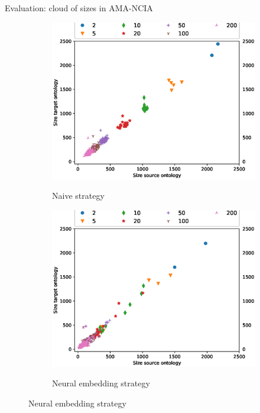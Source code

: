\documentclass[t]{beamer}
\begin{document}
\begin{frame}{Evaluation: cloud of sizes in AMA-NCIA }
	
\begin{figure}[t]
    \centering
    \begin{subfigure}[b]{0.495\textwidth}
        \centering
        \includegraphics[width=\textwidth]{figures/cloud_mouse_naive.eps}\\[-1ex]
        \caption{Naive strategy}
        \label{fig:mouse-naive}
    \end{subfigure}
    \begin{subfigure}[b]{0.495\textwidth}
        \centering
        \includegraphics[width=\textwidth]{figures/cloud_mouse_advanced.eps}\\[-1ex]
        \caption{Neural embedding strategy}
        \label{fig:mouse-advanced}
    \end{subfigure}
\end{figure}

\end{frame}
\end{document}
